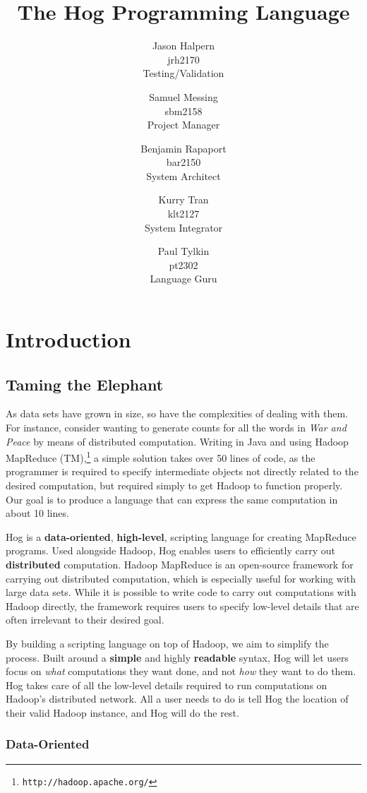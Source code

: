 \documentclass{book}
\title{\huge \textbf{The Hog Programming Language}}
\author{Jason Halpern \\ jrh2170 \\ Testing/Validation
        \and Samuel Messing \\ sbm2158 \\ Project Manager
        \and Benjamin Rapaport \\ bar2150 \\ System Architect
        \and Kurry Tran \\ klt2127 \\ System Integrator
        \and Paul Tylkin \\ pt2302 \\ Language Guru}
\begin{document}
\maketitle

\tableofcontents

\chapter{Introduction}
\label{chap:intro}

\section{Taming the Elephant}
\label{sec:elephant}

As data sets have grown in size, so have the complexities of dealing with them.
For instance, consider wanting to generate counts for all the words in
\emph{War and Peace} by means of distributed computation. Writing in Java and
using Hadoop MapReduce (TM),\footnote{\texttt{http://hadoop.apache.org/}} a
simple solution takes over 50 lines of code, as the programmer is required to
specify intermediate objects not directly related to the desired computation,
but required simply to get Hadoop to function properly. Our goal is to produce
a language that can express the same computation in about 10 lines.


Hog is a \textbf{data-oriented}, \textbf{high-level}, scripting language for
creating MapReduce\cite{dean:2004} programs. Used alongside Hadoop, Hog enables
users to efficiently carry out \textbf{distributed} computation. Hadoop
MapReduce is an open-source framework for carrying out distributed computation,
which is especially useful for working with large data sets. While it is
possible to write code to carry out computations with Hadoop directly, the
framework requires users to specify low-level details that are often irrelevant
to their desired goal.

By building a scripting language on top of Hadoop, we aim to simplify the
process. Built around a \textbf{simple} and highly \textbf{readable} syntax,
Hog will let users focus on \emph{what} computations they want done, and not
\emph{how} they want to do them.  Hog takes care of all the low-level details
required to run computations on Hadoop’s distributed network. All a user needs
to do is tell Hog the location of their valid Hadoop instance, and Hog will do
the rest. 

\subsection{Data-Oriented}
\label{sub:data-oriented}
\end{document}
